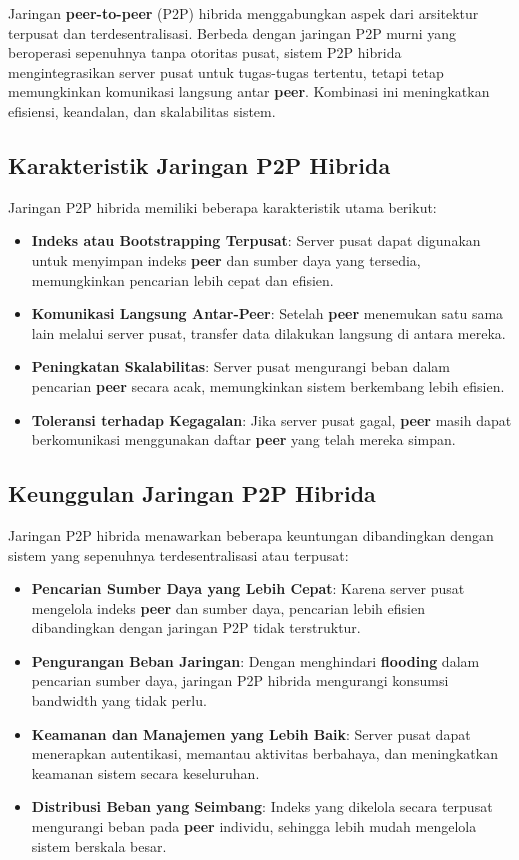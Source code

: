 Jaringan \textbf{peer-to-peer} (P2P) hibrida menggabungkan aspek dari arsitektur terpusat dan terdesentralisasi. Berbeda dengan jaringan P2P murni yang beroperasi sepenuhnya tanpa otoritas pusat, sistem P2P hibrida mengintegrasikan server pusat untuk tugas-tugas tertentu, tetapi tetap memungkinkan komunikasi langsung antar \textbf{peer}. Kombinasi ini meningkatkan efisiensi, keandalan, dan skalabilitas sistem.

\subsection{Karakteristik Jaringan P2P Hibrida}
Jaringan P2P hibrida memiliki beberapa karakteristik utama berikut:
\begin{itemize}
	\item \textbf{Indeks atau Bootstrapping Terpusat}: Server pusat dapat digunakan untuk menyimpan indeks \textbf{peer} dan sumber daya yang tersedia, memungkinkan pencarian lebih cepat dan efisien.
	\item \textbf{Komunikasi Langsung Antar-Peer}: Setelah \textbf{peer} menemukan satu sama lain melalui server pusat, transfer data dilakukan langsung di antara mereka.
	\item \textbf{Peningkatan Skalabilitas}: Server pusat mengurangi beban dalam pencarian \textbf{peer} secara acak, memungkinkan sistem berkembang lebih efisien.
	\item \textbf{Toleransi terhadap Kegagalan}: Jika server pusat gagal, \textbf{peer} masih dapat berkomunikasi menggunakan daftar \textbf{peer} yang telah mereka simpan.
\end{itemize}

\subsection{Keunggulan Jaringan P2P Hibrida}
Jaringan P2P hibrida menawarkan beberapa keuntungan dibandingkan dengan sistem yang sepenuhnya terdesentralisasi atau terpusat:
\begin{itemize}
	\item \textbf{Pencarian Sumber Daya yang Lebih Cepat}: Karena server pusat mengelola indeks \textbf{peer} dan sumber daya, pencarian lebih efisien dibandingkan dengan jaringan P2P tidak terstruktur.
	\item \textbf{Pengurangan Beban Jaringan}: Dengan menghindari \textbf{flooding} dalam pencarian sumber daya, jaringan P2P hibrida mengurangi konsumsi bandwidth yang tidak perlu.
	\item \textbf{Keamanan dan Manajemen yang Lebih Baik}: Server pusat dapat menerapkan autentikasi, memantau aktivitas berbahaya, dan meningkatkan keamanan sistem secara keseluruhan.
	\item \textbf{Distribusi Beban yang Seimbang}: Indeks yang dikelola secara terpusat mengurangi beban pada \textbf{peer} individu, sehingga lebih mudah mengelola sistem berskala besar.
\end{itemize}

